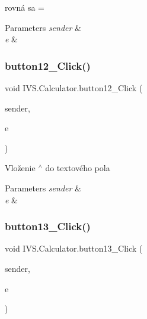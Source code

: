 rovná sa = 


\begin{DoxyParams}{Parameters}
{\em sender} & \\
\hline
{\em e} & \\
\hline
\end{DoxyParams}
\mbox{\label{class_i_v_s_1_1_calculator_a654a46c56d62a6b2b11bdf8b729f5102}} 
\subsubsection{\texorpdfstring{button12\+\_\+\+Click()}{button12\_Click()}}
{\footnotesize\ttfamily void I\+V\+S.\+Calculator.\+button12\+\_\+\+Click (\begin{DoxyParamCaption}\item[{object}]{sender,  }\item[{Event\+Args}]{e }\end{DoxyParamCaption})\hspace{0.3cm}{\ttfamily [protected]}}



Vloženie \textquotesingle{}$^\wedge$\textquotesingle{} do textového pola 


\begin{DoxyParams}{Parameters}
{\em sender} & \\
\hline
{\em e} & \\
\hline
\end{DoxyParams}
\mbox{\label{class_i_v_s_1_1_calculator_a03fca7b882c86953efac6a229c1289db}} 
\subsubsection{\texorpdfstring{button13\+\_\+\+Click()}{button13\_Click()}}
{\footnotesize\ttfamily void I\+V\+S.\+Calculator.\+button13\+\_\+\+Click (\begin{DoxyParamCaption}\item[{object}]{sender,  }\item[{Event\+Args}]{e }\end{DoxyParamCaption})\hspace{0.3cm}{\ttfamily [protected]}}




